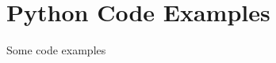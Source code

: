\chapter{Python Code Examples}
\label{ch:code-python}

\begin{preamble}
Some code examples
\end{preamble}

